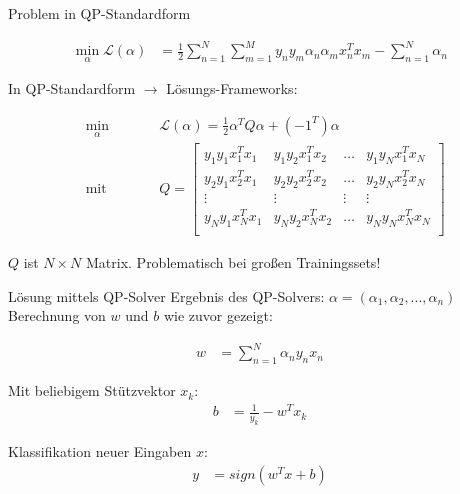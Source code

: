 \documentclass[ngerman]{beamer}
\newcommand{\Lagr}{\mathcal{L}}
\begin{document}
\begin{frame}{Problem in QP-Standardform}
	
	\begin{equation*}
		\begin{aligned}
			\min_{\alpha} \Lagr(\alpha) &= \frac{1}{2} \sum_{n=1}^{N} \sum_{m=1}^{M} y_{n} y_{m} \alpha_{n} \alpha_{m} x_{n}^{T} x_{m} - \sum_{n=1}^{N} \alpha_{n}
		\end{aligned}
	\end{equation*}
	
	In QP-Standardform $\rightarrow$ Lösungs-Frameworks:
	
	\begin{subequations}
		\begin{alignat*}{2}
			&\!\min_{\alpha}        &\qquad& \Lagr(\alpha) = \frac{1}{2} \alpha^{T} Q \alpha + (-1^T) \alpha \label{eq:qp1}\\
			&\text{mit} &      & Q = \begin{bmatrix} 
				y_{1}y_{1}x_{1}^{T}x_{1} & y_{1}y_{2}x_{1}^{T}x_{2} & \dots & y_{1}y_{N}x_{1}^{T}x_{N}\\
				y_{2}y_{1}x_{2}^{T}x_{1} & y_{2}y_{2}x_{2}^{T}x_{2} & \dots & y_{2}y_{N}x_{2}^{T}x_{N}\\
				\vdots & \vdots & \vdots & \vdots\\
				y_{N}y_{1}x_{N}^{T}x_{1} & y_{N}y_{2}x_{N}^{T}x_{2} & \dots & y_{N}y_{N}x_{N}^{T}x_{N}\\ 
			\end{bmatrix}
		\end{alignat*}
	\end{subequations}

	\pause

	$Q$ ist $N \times N$ Matrix. Problematisch bei großen Trainingssets!
\end{frame}

\begin{frame}{Lösung mittels QP-Solver}
	Ergebnis des QP-Solvers: $\alpha = (\alpha_{1}, \alpha_{2}, ..., \alpha_{n})$ \\
	
	Berechnung von $w$ und $b$ wie zuvor gezeigt:
	
	\begin{equation*}
		\begin{aligned}
			w &= \sum_{n=1}^{N} \alpha_{n} y_{n} x_{n}
		\end{aligned}
	\end{equation*}

	Mit beliebigem Stützvektor $x_{k}$:
	\begin{equation*}
		\begin{aligned}
			b &= \frac{1}{y_{k}} - w^{T} x_{k}
		\end{aligned}
	\end{equation*}

	Klassifikation neuer Eingaben $x$:
	\begin{equation*}
		\begin{aligned}
			y &= sign(w^{T} x + b)
		\end{aligned}
	\end{equation*}

\end{frame}
\end{document}
